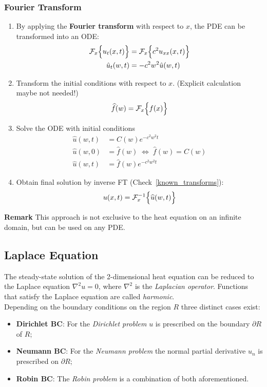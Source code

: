 \subsubsection{Fourier Transform}
\begin{enumerate}
    \item By applying the \textbf{Fourier transform} with respect to $x$, the PDE can be
          transformed into an ODE:
          \begin{align*}
              \mathcal{F}_x\Bigl\{u_t(x,t)\Bigr\} & =\mathcal{F}_x\Bigl\{c^2u_{xx}(x,t)\Bigr\} \\
              \hat{u}_t(w,t)                      & =-c^2w^2\hat{u}(w,t)
          \end{align*}
    \item Transform the initial conditions with respect to $x$. (Explicit calculation maybe not needed!)
          \begin{equation*}
              \widehat{f}(w)=\mathcal{F}_x\Bigl\{f(x)\Bigr\}
          \end{equation*}
    \item Solve the ODE with initial conditions
          \begin{align*}
              \hat{u}(w,t) & =C(w)e^{-c^2w^2t}                             \\
              \hat{u}(w,0) & =\hat{f}(w)\;\Leftrightarrow\;\hat{f}(w)=C(w) \\
              \hat{u}(w,t) & =\hat{f}(w)e^{-c^2w^2t}
          \end{align*}
    \item Obtain final solution by inverse FT (Check~\ref{known_transforms}):
          \begin{equation*}
              u(x,t)=\mathcal{F}_x^{-1}\Bigl\{\widehat{u}(w,t)\Bigr\}
          \end{equation*}
\end{enumerate}
\textbf{Remark} This approach is not exclusive to the heat equation on an infinite domain, but can be used
on any PDE.

\subsection{Laplace Equation}\label{ssec:laplace}
The steady-state solution of the 2-dimensional heat equation can be reduced to the Laplace equation $\nabla^2 u=0$, where $\nabla^2$ is the \textit{Laplacian operator}. Functions that satisfy the Laplace equation are called \textit{harmonic}. \\
Depending on the boundary conditions on the region $R$ three distinct cases exist:
\begin{itemize}
    \item \textbf{Dirichlet BC}: For the \textit{Dirichlet problem} $u$ is prescribed on the boundary $\partial R$ of $R$;
    \item \textbf{Neumann BC}: For the \textit{Neumann problem} the normal partial derivative $u_n$ is prescribed on $\partial R$;
    \item \textbf{Robin BC}: The \textit{Robin problem} is a combination of both aforementioned.
\end{itemize}

